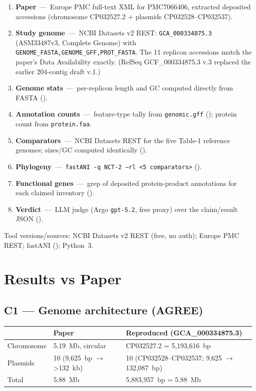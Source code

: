 \documentclass[11pt]{article}
\begin{document}
\begin{enumerate}
\item \textbf{Paper}~---~Europe PMC full-text XML for PMC7066406, extracted deposited accessions (chromosome CP032527.2 + plasmids CP032528--CP032537).
\item \textbf{Study genome}~---~NCBI Datasets v2 REST: \texttt{GCA\_000334875.3} (ASM33487v3, Complete Genome) with \texttt{GENOME\_FASTA,GENOME\_GFF,PROT\_FASTA}. The 11 replicon accessions match the paper's Data Availability exactly. (RefSeq GCF\_000334875.3 v.3 replaced the earlier 204-contig draft v.1.)
\item \textbf{Genome stats}~---~per-replicon length and GC computed directly from FASTA ().
\item \textbf{Annotation counts}~---~feature-type tally from \texttt{genomic.gff} (); protein count from \texttt{protein.faa}.
\item \textbf{Comparators}~---~NCBI Datasets REST for the five Table-1 reference genomes; sizes/GC computed identically ().
\item \textbf{Phylogeny}~---~\texttt{fastANI -q NCT-2 --rl <5 comparators>} ().
\item \textbf{Functional genes}~---~grep of deposited protein-product annotations for each claimed inventory ().
\item \textbf{Verdict}~---~LLM judge (Argo \texttt{gpt-5.2}, free proxy) over the claim/result JSON ().
\end{enumerate}

Tool versions/sources: NCBI Datasets v2 REST (free, no auth); Europe PMC REST; fastANI (); Python~3.

\section{Results vs Paper}

\subsection*{C1 --- Genome architecture (AGREE)}
\begin{tabular}{@{}lll@{}}
\toprule
 & Paper & Reproduced (GCA\_000334875.3) \\
\midrule
Chromosome & 5.19~Mb, circular & CP032527.2 = 5{,}193{,}616~bp \\
Plasmids & 10 (9{,}625~bp $\rightarrow$ >132~kb) & 10 (CP032528--CP032537; 9{,}625 $\rightarrow$ 132{,}087~bp) \\
Total & 5.88~Mb & 5{,}883{,}957~bp = 5.88~Mb \\
\bottomrule
\end{tabular}
\end{document}
